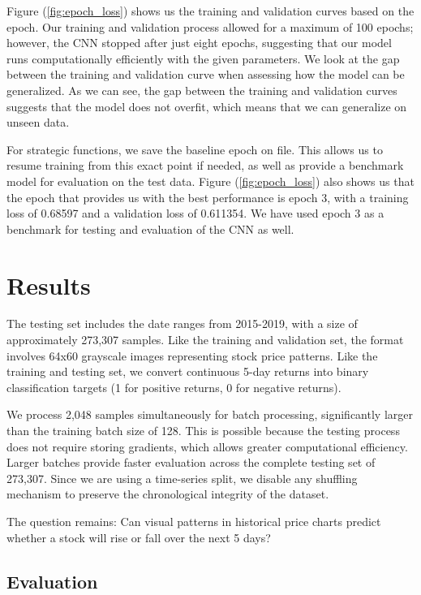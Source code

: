 \documentclass[12pt]{article}
\begin{document}
Figure (\ref{fig:epoch_loss}) shows us the training and validation curves based on the epoch. Our training and validation process allowed for a maximum of 100 epochs; however, the CNN stopped after just eight epochs, suggesting that our model runs computationally efficiently with the given parameters. We look at the gap between the training and validation curve when assessing how the model can be generalized. As we can see, the gap between the training and validation curves suggests that the model does not overfit, which means that we can generalize on unseen data.

For strategic functions, we save the baseline epoch on file. This allows us to resume training from this exact point if needed, as well as provide a benchmark model for evaluation on the test data. Figure (\ref{fig:epoch_loss}) also shows us that the epoch that provides us with the best performance is epoch 3, with a training loss of 0.68597 and a validation loss of 0.611354. We have used epoch 3 as a benchmark for testing and evaluation of the CNN as well.

\section*{Results}


The testing set includes the date ranges from 2015-2019, with a size of approximately 273,307 samples. Like the training and validation set, the format involves 64x60 grayscale images representing stock price patterns. Like the training and testing set, we convert continuous 5-day returns into binary classification targets (1 for positive returns, 0 for negative returns). 

We process 2,048 samples simultaneously for batch processing, significantly larger than the training batch size of 128. This is possible because the testing process does not require storing gradients, which allows greater computational efficiency. Larger batches provide faster evaluation across the complete testing set of 273,307. Since we are using a time-series split, we disable any shuffling mechanism to preserve the chronological integrity of the dataset.

The question remains: Can visual patterns in historical price charts predict whether a stock will rise or fall over the next 5 days?

\subsection*{Evaluation}
\end{document}
